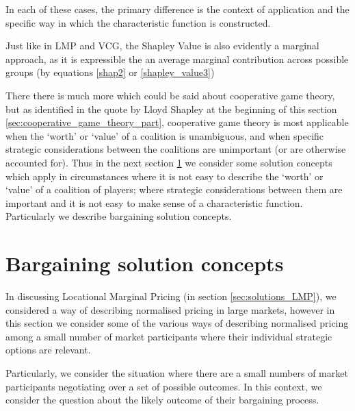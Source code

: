 In each of these cases, the primary difference is the context of application and the specific way in which the characteristic function is constructed.

Just like in LMP and VCG, the Shapley Value is also evidently a marginal approach, as it is expressible the an average marginal contribution across possible groups (by equations \ref{shap2} or \ref{shapley_value3})


There there is much more which could be said about cooperative game theory, but as identified in the quote by Lloyd Shapley at the beginning of this section \ref{sec:cooperative_game_theory_part}, cooperative game theory is most applicable when the `worth' or `value' of a coalition is unambiguous, and when specific strategic considerations between the coalitions are unimportant (or are otherwise accounted for).
Thus in the next section \ref{sec:solutions_bargaining} we consider some solution concepts which apply in circumstances where it is not easy to describe the `worth' or `value' of a coalition of players; where strategic considerations between them are important and it is not easy to make sense of a characteristic function.
Particularly we describe bargaining solution concepts.


\section{Bargaining solution concepts}\label{sec:solutions_bargaining}

In discussing Locational Marginal Pricing (in section \ref{sec:solutions_LMP}), we considered a way of describing normalised pricing in large markets, however in this section we consider some of the various ways of describing normalised pricing among a small number of market participants where their individual strategic options are relevant.

Particularly, we consider the situation where there are a small numbers of market participants negotiating over a set of possible outcomes.
In this context, we consider the question about the likely outcome of their bargaining process.


